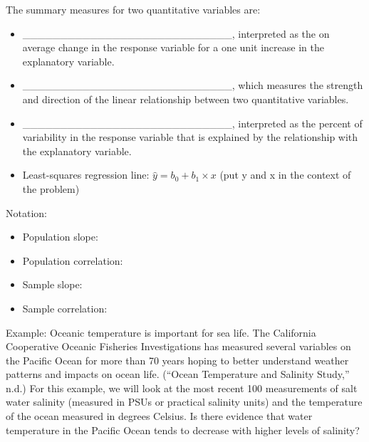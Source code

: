 \documentclass[
]{report}
\providecommand{\tightlist}{%
  \setlength{\itemsep}{0pt}\setlength{\parskip}{0pt}}
\begin{document}
The summary measures for two quantitative variables are:

\begin{itemize}
\tightlist
\item
  \_\_\_\_\_\_\_\_\_\_\_\_\_\_\_\_\_\_\_\_\_\_\_\_\_\_\_\_, interpreted as the on average change in the response variable for a one unit increase in the explanatory variable.
\end{itemize}

\vspace{1mm}

\begin{itemize}
\tightlist
\item
  \_\_\_\_\_\_\_\_\_\_\_\_\_\_\_\_\_\_\_\_\_\_\_\_\_\_\_\_, which measures the strength and direction of the linear relationship between two quantitative variables.
\end{itemize}

\vspace{1mm}

\begin{itemize}
\tightlist
\item
  \_\_\_\_\_\_\_\_\_\_\_\_\_\_\_\_\_\_\_\_\_\_\_\_\_\_\_\_, interpreted as the percent of variability in the response variable that is explained by the relationship with the explanatory variable.
\end{itemize}

\vspace{1mm}


\begin{itemize}
\tightlist
\item
  Least-squares regression line: \(\hat{y}=b_0+b_1\times x\) (put y and x in the context of the problem)
\end{itemize}


Notation:

\begin{itemize}
\item
  Population slope:
\item
  Population correlation:
\item
  Sample slope:
\item
  Sample correlation:
\end{itemize}


Example: Oceanic temperature is important for sea life. The California Cooperative Oceanic Fisheries Investigations has measured several variables on the Pacific Ocean for more than 70 years hoping to better understand weather patterns and impacts on ocean life. ({``Ocean Temperature and Salinity Study,''} n.d.) For this example, we will look at the most recent 100 measurements of salt water salinity (measured in PSUs or practical salinity units) and the temperature of the ocean measured in degrees Celsius. Is there evidence that water temperature in the Pacific Ocean tends to decrease with higher levels of salinity?
\end{document}
